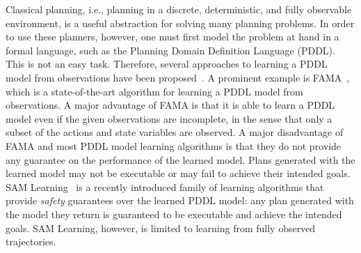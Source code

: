\documentclass[letterpaper]{article} %
\begin{document}
Classical planning, i.e., planning in a discrete, deterministic, and fully observable environment, is a useful abstraction for solving many planning problems.
In order to use these planners, however, one must first model the problem at hand in a formal language, such as the Planning Domain Definition Language (PDDL). This is not an easy task. Therefore, several approaches to learning a PDDL model from observations have been proposed~\citep{aineto2019learning,stern2017efficientAndSafe,juba2021safe,cresswell2013acquiring,wu2007arms}. A prominent example is FAMA~\citep{aineto2019learning}, which is a state-of-the-art algorithm for learning a PDDL model from observations. A major advantage of FAMA is that it is able to learn a PDDL model even if the given observations are incomplete, in the sense that only a subset of the actions and state variables are observed.
A major disadvantage of FAMA and most PDDL model learning algorithms is that they do not provide any guarantee on the performance of the learned model.
Plans generated with the learned model may not be executable or may fail to achieve their intended goals.
SAM Learning~\citep{stern2017efficientAndSafe,juba2021safe,juba2022learning,mordoch2022collaborative} is a recently introduced family of learning algorithms that provide \emph{safety} guarantees over the learned PDDL model: any plan generated with the model they return is guaranteed to be executable and achieve the intended goals.
SAM Learning, however, is limited to learning from fully observed trajectories.
\end{document}
